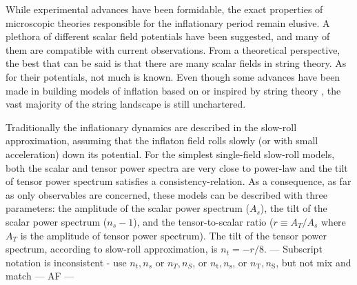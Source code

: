 \documentclass[a4paper,11pt]{article}
\begin{document}
While experimental advances have been formidable, the exact properties of microscopic theories responsible for the inflationary period remain elusive. A plethora of different scalar field potentials have been suggested, and many of them are compatible with current observations. From a theoretical perspective, the best that can be said is that there are many scalar fields in string theory. As for their potentials, not much is known. Even though some advances have been made in building models of inflation based on or inspired by string theory \cite{KKLT, Blanco-Pillado:2004ns, Blanco-Pillado:2006he, KKLMMT, CQ, GKP, Silverstein:2008sg}, the vast majority of the string landscape is still unchartered.


Traditionally the inflationary dynamics are described in the slow-roll approximation, assuming that the inflaton field rolls slowly (or with small acceleration) down its potential. For the simplest single-field slow-roll models, both the scalar and tensor power spectra are very close to power-law and the tilt of tensor power spectrum satisfies a consistency-relation. As a consequence, as far as only observables are concerned, these models can be described with three parameters: the amplitude of the scalar power spectrum ($A_s$), the tilt of the scalar power spectrum ($n_s-1$), and the tensor-to-scalar ratio ($r \equiv A_T/A_s$ where $A_T$ is the amplitude of tensor power spectrum). The tilt of the tensor power spectrum, according to slow-roll approximation, is $n_t = -r/8$. 
{\color{red} --- Subscript notation is inconsistent - use $n_t, n_s$ or $n_T, n_S$, or $n_{\text{t}}, n_{\text{s}}$, or $n_{\text{T}}, n_{\text{S}}$, but not mix and match --- AF ---}
\end{document}
